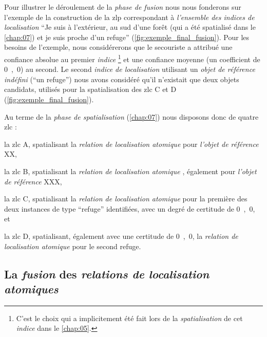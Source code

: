 Pour illustrer le déroulement de la \emph{phase de fusion} nous nous
fonderons sur l'exemple de la construction de la \ac{zlp}
correspondant à \emph{l'ensemble des indices de localisation}
\enquote{Je suis à l'extérieur, au sud d'une forêt (qui a été
  spatialisé dans le \autoref{chap:07}) et je suis proche d'un refuge}
(\autoref{fig:exemple_final_fusion}). Pour les besoins de l'exemple,
nous considérerons que le secouriste a attribué une confiance absolue
au premier \emph{indice} \footnote{C'est le choix qui a implicitement
  été fait lors de la \emph{spatialisation} de cet \emph{indice} dans
  le \autoref{chap:05}.} et une confiance moyenne (\ie un coefficient
de \si{0,0}) au second. Le second \emph{indice de localisation}
utilisant un \emph{objet de référence indéfini} (\eg \enquote{un
  refuge}) nous avons considéré qu'il n'existait que deux objets
candidats, utilisés pour la spatialisation des \ac{zlc}
\textcolor{RdBu-9-8}{\textsf{C}} et \textcolor{RdBu-9-9}{\textsf{D}}
(\autoref{fig:exemple_final_fusion}).

Au terme de la \emph{phase de spatialisation} (\autoref{chap:07}) nous
disposons donc de quatre \ac{zlc} :
% 
\begin{enumerate*}[label=(\arabic*)]
\item la \ac{zlc} \textcolor{RdBu-9-1}{\textsf{A}}, spatialisant la \emph{relation de localisation
    atomique}  pour \emph{l'objet de référence}
  XX,
\item la \ac{zlc} \textcolor{RdBu-9-2}{\textsf{B}}, spatialisant la \emph{relation de localisation
    atomique} , également pour \emph{l'objet de
    référence} XXX,
\item la \ac{zlc} \textcolor{RdBu-9-8}{\textsf{C}}, spatialisant la \emph{relation de localisation
    atomique}  pour la première des deux instances de
  type \enquote{refuge} identifiées, avec un degré de certitude de \si{0,0}, et
\item la \ac{zlc} \textcolor{RdBu-9-9}{\textsf{D}}, spatialisant,
  également avec une certitude de \si{0,0}, la \emph{relation de
    localisation atomique}  pour le second refuge.
\end{enumerate*}
% 

\subsection{La \emph{fusion} des \emph{relations de localisation
    atomiques}}

